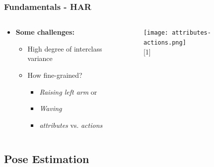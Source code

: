 \documentclass[9pt]{beamer}
\providecommand{\sourcefix}[1]{\\ \footnotesize \tugreen{Source:} [#1]}
\newenvironment{myframe}[1][]{%
\begin{frame}%
\frametitle{#1}
\setcounter{footnote}{0}


}{%
\end{frame}%
}
\begin{document}
\begin{myframe}[Fundamentals - HAR]
    \note[item]{}
    \begin{columns}
        \begin{column}{.48\linewidth}
            \begin{itemize}
                \item \textbf{Some challenges:}
                    \begin{itemize}
                        \item High degree of interclass variance
                        \item How fine-grained?
                        \begin{itemize}
                            \item \textit{Raising left arm} or
                            \item \textit{Waving}
                            \item \textit{attributes} vs. \textit{actions} \footnotemark
                        \end{itemize}
                    \end{itemize}
            \end{itemize}
        \end{column}
        \begin{column}{.48\linewidth}
            \begin{figure}
                \texttt{[image: attributes-actions.png]}
                \sourcefix{1}
            \end{figure}
        \end{column}
    \end{columns}
\end{myframe}

\subsection{Pose Estimation}
\end{document}
